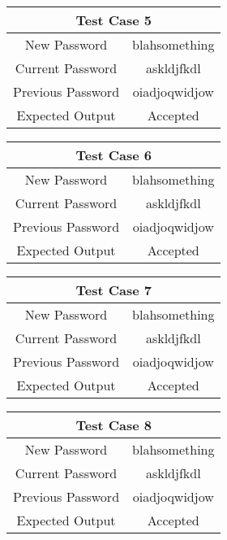 \documentclass[12pt,letterpaper]{article}
\begin{document}
\begin{table}[h]
\begin{centering}
\begin{tabular}{||c|c||}
  \hline
  \multicolumn{2}{||c||}{Test Case 5} \\
  \hline
  New Password & blahsomething \\
  \hline
  Current Password & askldjfkdl \\
  \hline
  Previous Password & oiadjoqwidjow \\
  \hline
  Expected Output & Accepted \\
  \hline
  \end{tabular}
  \begin{tabular}{||c|c||}
  \hline
  \multicolumn{2}{||c||}{Test Case 6} \\
  \hline
  New Password & blahsomething \\
  \hline
  Current Password & askldjfkdl \\
  \hline
  Previous Password & oiadjoqwidjow \\
  \hline
  Expected Output & Accepted \\
  \hline
  \end{tabular}
  \begin{tabular}{||c|c||}
  \hline
  \multicolumn{2}{||c||}{Test Case 7} \\
  \hline
  New Password & blahsomething \\
  \hline
  Current Password & askldjfkdl \\
  \hline
  Previous Password & oiadjoqwidjow \\
  \hline
  Expected Output & Accepted \\
  \hline
  \end{tabular}
  \begin{tabular}{||c|c||}
  \hline
  \multicolumn{2}{||c||}{Test Case 8} \\
  \hline
  New Password & blahsomething \\
  \hline
  Current Password & askldjfkdl \\
  \hline
  Previous Password & oiadjoqwidjow \\
  \hline
  Expected Output & Accepted \\
  \hline
  \end{tabular}




\end{centering}


\end{table}
\end{document}
